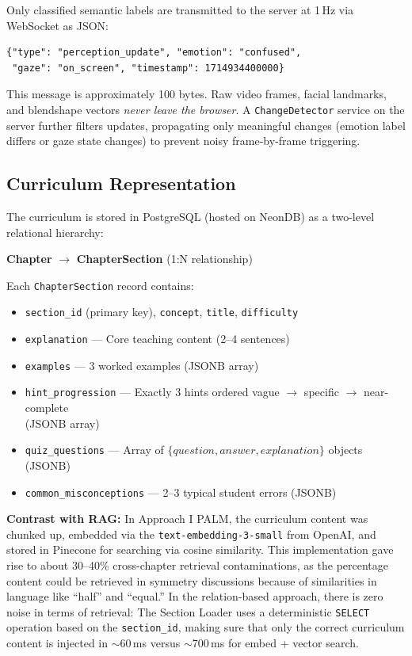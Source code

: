 \documentclass[conference, letterpaper]{IEEEtran}
\begin{document}
Only classified semantic labels are transmitted to the server at 1\,Hz via WebSocket as JSON:
\begin{verbatim}
{"type": "perception_update", "emotion": "confused",
 "gaze": "on_screen", "timestamp": 1714934400000}
\end{verbatim}
This message is approximately 100 bytes. Raw video frames, facial landmarks, and blendshape vectors \emph{never leave the browser}. A \texttt{ChangeDetector} service on the server further filters updates, propagating only meaningful changes (emotion label differs or gaze state changes) to prevent noisy frame-by-frame triggering.

\subsection{Curriculum Representation}

The curriculum is stored in PostgreSQL (hosted on NeonDB) as a two-level relational hierarchy:

\textbf{Chapter} $\rightarrow$ \textbf{ChapterSection} (1:N relationship)

Each \texttt{ChapterSection} record contains:
\begin{itemize}[nosep]
    \item \texttt{section\_id} (primary key), \texttt{concept}, \texttt{title}, \texttt{difficulty}
    \item \texttt{explanation} --- Core teaching content (2--4 sentences)
    \item \texttt{examples} --- 3 worked examples (JSONB array)
    \item \texttt{hint\_progression} --- Exactly 3 hints ordered vague $\rightarrow$ specific $\rightarrow$ near-complete \\ (JSONB array)
    \item \texttt{quiz\_questions} --- Array of $\{question, answer, explanation\}$ objects (JSONB)
    \item \texttt{common\_misconceptions} --- 2--3 typical student errors (JSONB)
\end{itemize}

\textbf{Contrast with RAG:} In Approach I PALM, the curriculum content was chunked up, embedded via the \texttt{text-embedding-3-small} from OpenAI, and stored in Pinecone for searching via cosine similarity. This implementation gave rise to about 30--40\% cross-chapter retrieval contaminations, as the percentage content could be retrieved in symmetry discussions because of similarities in language like “half” and “equal.” In the relation-based approach, there is zero noise in terms of retrieval: The Section Loader uses a deterministic \texttt{SELECT} operation based on the \texttt{section\_id}, making sure that only the correct curriculum content is injected in $\sim$60\,ms versus $\sim$700\,ms for embed + vector search.
\end{document}
